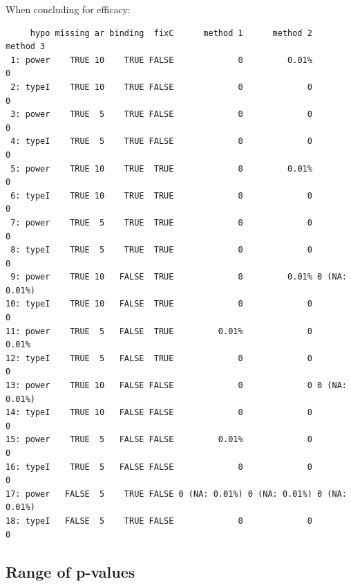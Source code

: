 \documentclass[12pt]{article}
\begin{document}
When concluding for efficacy:
\begin{verbatim}
     hypo missing ar binding  fixC      method 1      method 2      method 3
 1: power    TRUE 10    TRUE FALSE             0         0.01%             0
 2: typeI    TRUE 10    TRUE FALSE             0             0             0
 3: power    TRUE  5    TRUE FALSE             0             0             0
 4: typeI    TRUE  5    TRUE FALSE             0             0             0
 5: power    TRUE 10    TRUE  TRUE             0         0.01%             0
 6: typeI    TRUE 10    TRUE  TRUE             0             0             0
 7: power    TRUE  5    TRUE  TRUE             0             0             0
 8: typeI    TRUE  5    TRUE  TRUE             0             0             0
 9: power    TRUE 10   FALSE  TRUE             0         0.01% 0 (NA: 0.01%)
10: typeI    TRUE 10   FALSE  TRUE             0             0             0
11: power    TRUE  5   FALSE  TRUE         0.01%             0         0.01%
12: typeI    TRUE  5   FALSE  TRUE             0             0             0
13: power    TRUE 10   FALSE FALSE             0             0 0 (NA: 0.01%)
14: typeI    TRUE 10   FALSE FALSE             0             0             0
15: power    TRUE  5   FALSE FALSE         0.01%             0             0
16: typeI    TRUE  5   FALSE FALSE             0             0             0
17: power   FALSE  5    TRUE FALSE 0 (NA: 0.01%) 0 (NA: 0.01%) 0 (NA: 0.01%)
18: typeI   FALSE  5    TRUE FALSE             0             0             0
\end{verbatim}

\subsection{Range of p-values}
\label{sec:orgecab4fc}
\end{document}
